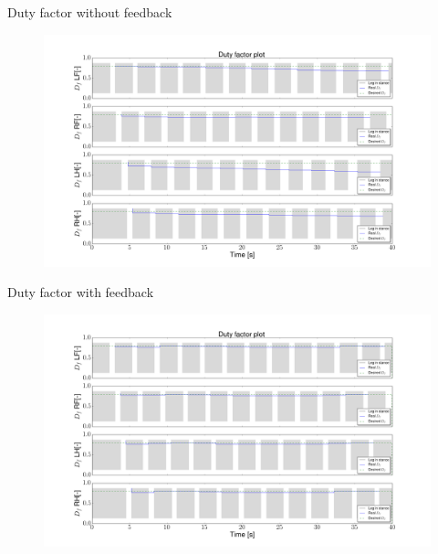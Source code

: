 \documentclass{beamer}
\begin{document}
\begin{frame}{Duty factor without feedback}
\vspace{-1cm}
	\begin{figure}[ht]\centering
		\includegraphics[width=1.1\textwidth]{images/DutyFactorFF.png}
	\end{figure}\vspace{-20pt}
\end{frame}

\begin{frame}{Duty factor with feedback}
\vspace{-1cm}
	\begin{figure}[ht]\centering
		\includegraphics[width=1.1\textwidth]{images/DutyFactor.png}
	\end{figure}\vspace{-20pt}
\end{frame}
\end{document}
